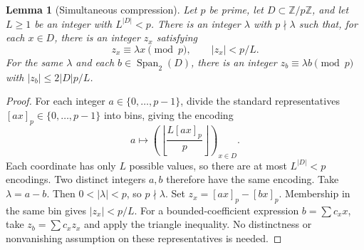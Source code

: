 \documentclass[12pt,leqno]{article}
\numberwithin{equation}{section}
\newtheorem{lemma}[theorem]{Lemma}
\theoremstyle{remark}
\begin{document}
\begin{lemma}[Simultaneous compression]\label{lem:simcompress}
Let $p$ be prime, let $D\subset\mathbb Z/p\mathbb Z$, and let $L\ge1$ be an integer with $L^{|D|}<p$. There is an integer $\lambda$ with $p\nmid\lambda$ such that, for each $x\in D$, there is an integer $z_x$ satisfying
\[
z_x\equiv\lambda x\pmod p,\qquad |z_x|<p/L.
\]
For the same $\lambda$ and each $b\in\operatorname{Span}_2(D)$, there is an integer $z_b\equiv\lambda b\pmod p$ with $|z_b|\le2|D|p/L$.
\end{lemma}
\begin{proof}
For each integer $a\in\{0,\ldots,p-1\}$, divide the standard representatives $[ax]_p\in\{0,\ldots,p-1\}$ into bins, giving the encoding
\[
a\longmapsto\left(\left\lfloor\frac{L[ax]_p}{p}\right\rfloor\right)_{x\in D}.
\]
Each coordinate has only $L$ possible values, so there are at most $L^{|D|}<p$ encodings. Two distinct integers $a,b$ therefore have the same encoding. Take $\lambda=a-b$. Then $0<|\lambda|<p$, so $p\nmid\lambda$. Set $z_x=[ax]_p-[bx]_p$. Membership in the same bin gives $|z_x|<p/L$. For a bounded-coefficient expression $b=\sum c_xx$, take $z_b=\sum c_xz_x$ and apply the triangle inequality. No distinctness or nonvanishing assumption on these representatives is needed.
\end{proof}
\end{document}
